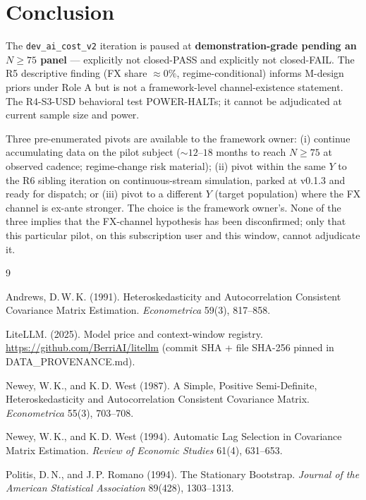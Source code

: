 \documentclass[11pt,letterpaper]{article}
\begin{document}
\section{Conclusion}
\label{sec:conclusion}

The \texttt{dev\_ai\_cost\_v2} iteration is paused at
\textbf{demonstration-grade pending an \(N \geq 75\) panel} ---
explicitly not closed-PASS and explicitly not closed-FAIL. The R5
descriptive finding (FX share \(\approx 0\%\), regime-conditional)
informs M-design priors under Role A but is not a framework-level
channel-existence statement. The R4-S3-USD behavioral test
POWER-HALTs; it cannot be adjudicated at current sample size and
power.

Three pre-enumerated pivots are available to the framework owner:
(i) continue accumulating data on the pilot subject (\(\sim 12\)--\(18\)
months to reach \(N \geq 75\) at observed cadence; regime-change risk
material); (ii) pivot within the same \(Y\) to the R6 sibling
iteration on continuous-stream simulation, parked at v0.1.3 and ready
for dispatch; or (iii) pivot to a different \(Y\) (target population)
where the FX channel is ex-ante stronger. The choice is the framework
owner's. None of the three implies that the FX-channel hypothesis has
been disconfirmed; only that this particular pilot, on this
subscription user and this window, cannot adjudicate it.

\begin{thebibliography}{9}

Andrews, D.\,W.\,K. (1991). Heteroskedasticity and Autocorrelation
Consistent Covariance Matrix Estimation. \emph{Econometrica} 59(3),
817--858.

LiteLLM. (2025). Model price and context-window registry.
\url{https://github.com/BerriAI/litellm} (commit SHA + file SHA-256
pinned in DATA\_PROVENANCE.md).

Newey, W.\,K., and K.\,D. West (1987). A Simple, Positive
Semi-Definite, Heteroskedasticity and Autocorrelation Consistent
Covariance Matrix. \emph{Econometrica} 55(3), 703--708.

Newey, W.\,K., and K.\,D. West (1994). Automatic Lag Selection in
Covariance Matrix Estimation. \emph{Review of Economic Studies}
61(4), 631--653.

Politis, D.\,N., and J.\,P. Romano (1994). The Stationary Bootstrap.
\emph{Journal of the American Statistical Association} 89(428),
1303--1313.

\end{thebibliography}
\end{document}
